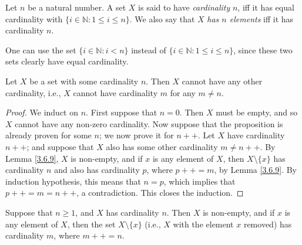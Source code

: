 \begin{definition}\label{3.6.5}
Let \(n\) be a natural number.
A set \(X\) is said to have \emph{cardinality} \(n\), iff it has equal cardinality with \(\{i \in \mathds{N} : 1 \leq i \leq n\}\).
We also say that \(X\) \emph{has \(n\) elements} iff it has cardinality \(n\).
\end{definition}

\begin{remark}\label{3.6.6}
One can use the set \(\{i \in \mathds{N} : i < n\}\) instead of \(\{i \in \mathds{N} : 1 \leq i \leq n\}\), since these two sets clearly have equal cardinality.
\end{remark}

\setcounter{theorem}{7}
\begin{proposition}\label{3.6.8}
Let \(X\) be a set with some cardinality \(n\).
Then \(X\) cannot have any other cardinality, i.e., \(X\) cannot have cardinality \(m\) for any \(m \neq n\).
\end{proposition}

\begin{proof}
We induct on \(n\).
First suppose that \(n = 0\).
Then \(X\) must be empty, and so \(X\) cannot have any non-zero cardinality.
Now suppose that the proposition is already proven for some \(n\);
we now prove it for \(n++\).
Let \(X\) have cardinality \(n++\);
and suppose that \(X\) also has some other cardinality \(m \neq n++\).
By Lemma \ref{3.6.9}, \(X\) is non-empty, and if \(x\) is any element of \(X\), then \(X \setminus \{x\}\) has cardinality \(n\) and also has cardinality \(p\), where \(p++ = m\), by Lemma \ref{3.6.9}.
By induction hypothesis, this means that \(n = p\), which implies that \(p++ = m = n++\), a contradiction.
This closes the induction.
\end{proof}

\begin{lemma}\label{3.6.9}
Suppose that \(n \geq 1\), and \(X\) has cardinality \(n\).
Then \(X\) is non-empty, and if \(x\) is any element of \(X\), then the set \(X \setminus \{x\}\) (i.e., \(X\) with the element \(x\) removed) has cardinality \(m\), where \(m++ = n\).
\end{lemma}

